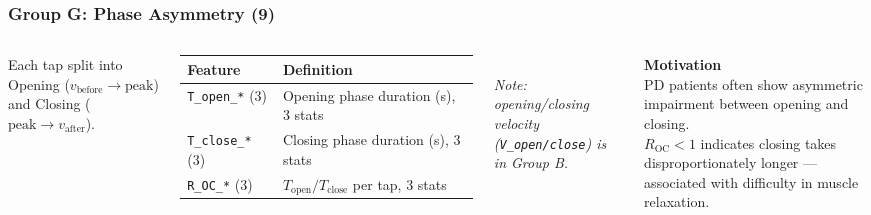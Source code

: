 \documentclass[aspectratio=169]{beamer}
\begin{document}
\begin{frame}
    \frametitle{Group G: Phase Asymmetry (9)}
    \scriptsize
    \begin{columns}[T]
        Each tap split into Opening ($v_\text{before}{\to}\text{peak}$) and Closing ($\text{peak}{\to}v_\text{after}$).\\[0.3em]
        \renewcommand{\arraystretch}{1.2}
        \begin{tabular}{p{2.8cm}p{4.2cm}}
            \toprule
            \textbf{Feature} & \textbf{Definition} \\
            \midrule
            \texttt{T\_open\_*} (3) & Opening phase duration (s), 3 stats \\
            \texttt{T\_close\_*} (3) & Closing phase duration (s), 3 stats \\
            \texttt{R\_OC\_*} (3) & $T_\text{open}/T_\text{close}$ per tap, 3 stats \\
            \bottomrule
        \end{tabular}\\[0.3em]
        \emph{Note: opening/closing velocity (\texttt{V\_open/close}) is in Group B.}

        \textbf{Motivation}\\[0.3em]
        PD patients often show asymmetric impairment between opening and closing.\\[0.4em]
        $R_\text{OC} < 1$ indicates closing takes disproportionately longer --- associated with difficulty in muscle relaxation.
    \end{columns}
\end{frame}
\end{document}
